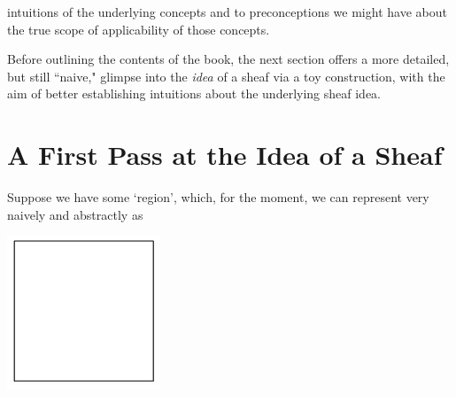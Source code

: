 \documentclass[11pt]{book}
\theoremstyle{definition}
\theoremstyle{definition}
\theoremstyle{definition}
\theoremstyle{theorem}
\theoremstyle{definition}
\begin{document}
intuitions of the underlying concepts and to preconceptions we might have about the true scope of applicability of those concepts. \par 
	Before outlining the contents of the book, the next section offers a more detailed, but still ``naive," glimpse into the \textit{idea} of a sheaf via a toy construction, with the aim of better establishing intuitions about the underlying sheaf idea.  
	\section{A First Pass at the Idea of a Sheaf}
	Suppose we have some `region', which, for the moment, we can represent very naively and abstractly as 
	\begin{center}
		\includegraphics[scale=0.4]{Sketchpad.png}
	\end{center}
\end{document}

